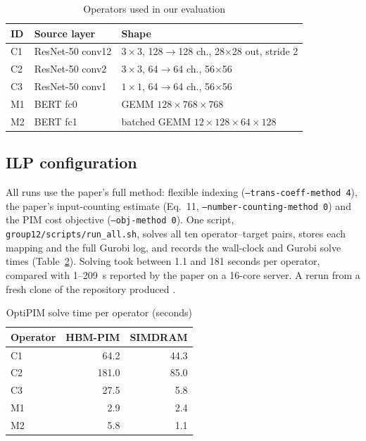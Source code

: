 \begin{table}[t]
\centering
\caption{Operators used in our evaluation}
\label{tab:ops}
\footnotesize
\begin{tabular}{lll}
\hline
ID & Source layer & Shape \\
\hline
C1 & ResNet-50 conv12 & $3{\times}3$, 128$\to$128 ch., 28$\times$28 out, stride 2 \\
C2 & ResNet-50 conv2  & $3{\times}3$, 64$\to$64 ch., 56$\times$56 \\
C3 & ResNet-50 conv1  & $1{\times}1$, 64$\to$64 ch., 56$\times$56 \\
M1 & BERT fc0         & GEMM $128{\times}768{\times}768$ \\
M2 & BERT fc1         & batched GEMM $12{\times}128{\times}64{\times}128$ \\
\hline
\end{tabular}
\end{table}

\subsection{ILP configuration}
All runs use the paper's full method: flexible indexing
(\texttt{--trans-coeff-method 4}), the paper's input-counting estimate
(Eq.~11, \texttt{--number-counting-method 0}) and the PIM cost objective
(\texttt{--obj-method 0}). One script, \texttt{group12/scripts/run\_all.sh},
solves all ten operator--target pairs, stores each mapping and the full
Gurobi log, and records the wall-clock and Gurobi solve times
(Table~\ref{tab:solve}). Solving took between 1.1 and 181
seconds per operator, compared with 1--209~s reported by the paper on a
16-core server. A rerun from a fresh clone of the repository produced .

\begin{table}[t]
\centering
\caption{OptiPIM solve time per operator (seconds)}
\label{tab:solve}
\begin{tabular}{lrr}
\hline
Operator & HBM-PIM & SIMDRAM \\
\hline
C1 & 64.2 & 44.3 \\
C2 & 181.0 & 85.0 \\
C3 & 27.5 & 5.8 \\
M1 & 2.9 & 2.4 \\
M2 & 5.8 & 1.1 \\
\hline
\end{tabular}
\end{table}



